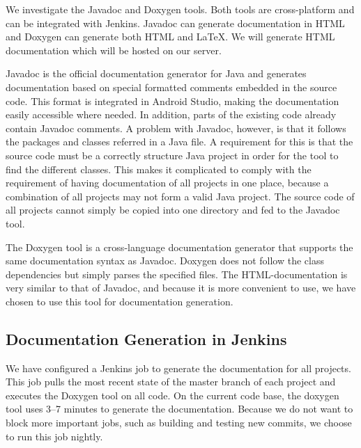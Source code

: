 We investigate the Javadoc\parencite{javadoc} and Doxygen\parencite{doxygen} tools. Both tools are cross-platform and can be integrated with Jenkins. Javadoc can generate documentation in HTML and Doxygen can generate both HTML and \LaTeX. We will generate HTML documentation which will be hosted on our server.

Javadoc is the official documentation generator for Java and generates documentation based on special formatted comments embedded in the source code. This format is integrated in Android Studio, making the documentation easily accessible where needed. In addition, parts of the existing code already contain Javadoc comments. A problem with Javadoc, however, is that it follows the packages and classes referred in a Java file. A requirement for this is that the source code must be a correctly structure Java project in order for the tool to find the different classes. This makes it complicated to comply with the requirement of having documentation of all projects in one place, because a combination of all projects may not form a valid Java project. The source code of all projects cannot simply be copied into one directory and fed to the Javadoc tool.

The Doxygen tool is a cross-language documentation generator that supports the same documentation syntax as Javadoc. Doxygen does not follow the class dependencies but simply parses the specified files. The HTML-documentation is very similar to that of Javadoc, and because it is more convenient to use, we have chosen to use this tool for documentation generation.

\subsection{Documentation Generation in Jenkins}
We have configured a Jenkins job to generate the documentation for all projects. This job pulls the most recent state of the master branch of each project and executes the Doxygen tool on all code. On the current code base, the doxygen tool uses 3--7 minutes to generate the documentation. Because we do not want to block more important jobs, such as building and testing new commits, we choose to run this job nightly.
